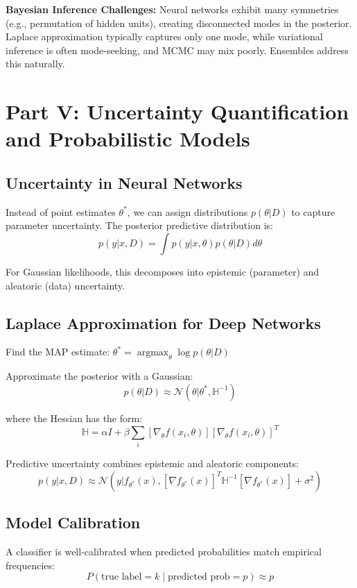 \documentclass[12pt,a4paper]{article}
\theoremstyle{definition}
\begin{document}
\textbf{Bayesian Inference Challenges:} Neural networks exhibit many symmetries (e.g., permutation of hidden units), creating disconnected modes in the posterior. Laplace approximation typically captures only one mode, while variational inference is often mode-seeking, and MCMC may mix poorly. Ensembles address this naturally.

\newpage

\section{Part V: Uncertainty Quantification and Probabilistic Models}

\subsection{Uncertainty in Neural Networks}

Instead of point estimates $\theta^*$, we can assign distributions $p(\theta|D)$ to capture parameter uncertainty. The posterior predictive distribution is:
\[
p(y|x, D) = \int p(y|x, \theta) p(\theta|D) d\theta
\]

For Gaussian likelihoods, this decomposes into epistemic (parameter) and aleatoric (data) uncertainty.

\subsection{Laplace Approximation for Deep Networks}

Find the MAP estimate: $\theta^* = \operatorname*{argmax}_\theta \log p(\theta|D)$

Approximate the posterior with a Gaussian:
\[
p(\theta|D) \approx \mathcal{N}(\theta | \theta^*, \mathbb{H}^{-1})
\]

where the Hessian has the form:
\[
\mathbb{H} = \alpha I + \beta \sum_i [\nabla_\theta f(x_i, \theta)] [\nabla_\theta f(x_i, \theta)]^T
\]

Predictive uncertainty combines epistemic and aleatoric components:
\[
p(y|x,D) \approx \mathcal{N}(y | f_{\theta^*}(x), [\nabla f_{\theta^*}(x)]^T \mathbb{H}^{-1} [\nabla f_{\theta^*}(x)] + \sigma^2)
\]

\subsection{Model Calibration}

A classifier is well-calibrated when predicted probabilities match empirical frequencies:
\[
P(\text{true label} = k \mid \text{predicted prob} = p) \approx p
\]
\end{document}
